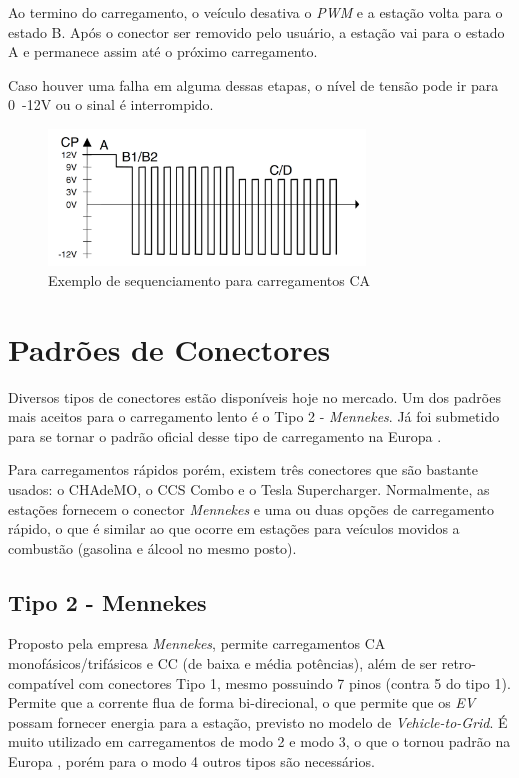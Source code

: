     Ao termino do carregamento, o veículo desativa o \textit{\ac{PWM}} e a estação volta para o estado B. Após o conector ser removido pelo usuário, a estação vai para o estado A e permanece assim até o próximo carregamento.

    Caso houver uma falha em alguma dessas etapas, o nível de tensão pode ir para 0~-12V ou o sinal é interrompido.

    \begin{figure}[H]
      \begin{center}
        \includegraphics[width=0.75\textwidth,natwidth=400,natheight=288]{assets/images/phoenix.jpg}
        \caption{Exemplo de sequenciamento para carregamentos CA}
        \label{fig:phoenix}
      \end{center}
    \end{figure}


  \section{Padrões de Conectores}
  \label{stateofart:plugs}

      Diversos tipos de conectores estão disponíveis hoje no mercado. Um dos padrões mais aceitos para o carregamento lento é o Tipo 2 - \textit{Mennekes}. Já foi submetido para se tornar o padrão oficial desse tipo de carregamento na Europa \cite{mckinsey-report-ev}.

      Para carregamentos rápidos porém, existem três conectores que são bastante usados: o CHAdeMO, o CCS Combo e o Tesla Supercharger. Normalmente, as estações fornecem o conector \textit{Mennekes} e uma ou duas opções de carregamento rápido, o que é similar ao que ocorre em estações para veículos movidos a combustão (gasolina e álcool no mesmo posto).

      \subsection{Tipo 2 - Mennekes}
      \label{stateofart:plugs:mennekes}

        Proposto pela empresa \textit{Mennekes}, permite carregamentos \ac{CA} monofásicos/trifásicos e \ac{CC} (de baixa e média potências), além de ser retro-compatível com conectores Tipo 1, mesmo possuindo 7 pinos (contra 5 do tipo 1). Permite que a corrente flua de forma bi-direcional, o que permite que os \textit{\ac{EV}} possam fornecer energia para a estação, previsto no modelo de \textit{Vehicle-to-Grid}. É muito utilizado em carregamentos de modo 2 e modo 3, o que o tornou padrão na Europa \cite{mennekes-news-standardplug}, porém para o modo 4 outros tipos são necessários.

